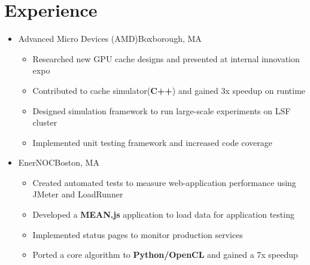 \documentclass[11pt,letterpaper,sans]{moderncv}
\begin{document}
\section{Experience}

\vspace{6pt}

\begin{itemize}


\item[] {
{Advanced Micro Devices (AMD)}{Boxborough, MA}{}{\vspace{3pt}}
\vspace{-3mm}	\begin{itemize}
	 \item Researched new GPU cache designs and presented at internal innovation expo
	 \item Contributed to cache simulator(\textbf{C++}) and gained 3x speedup on runtime
	 \item Designed simulation framework to run large-scale experiments on LSF cluster
	 \item Implemented unit testing framework and increased code coverage
	\end{itemize}
}
\vspace{6pt}

\item[] {
{EnerNOC}{Boston, MA}{}{\vspace{3pt}}
\vspace{-3mm}	\begin{itemize}
	 \item Created automated tests to measure 
web-application performance using JMeter and LoadRunner
	 \item Developed a \textbf{MEAN.js} application to load data for application testing
	 \item Implemented status pages to monitor production services
	 \item Ported a core algorithm to \textbf{Python/OpenCL} and gained a 7x speedup
	\end{itemize}
}
\vspace{6pt}



\end{itemize}
\end{document}
